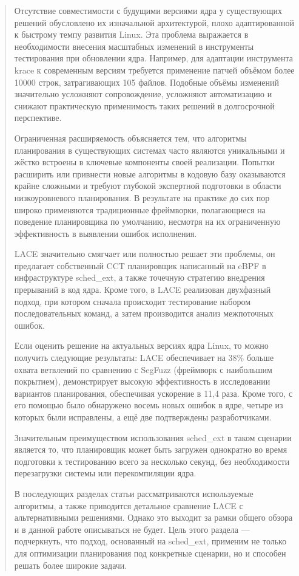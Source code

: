 \documentclass[12pt, oneside]{book}
\begin{document}
\begin{quote}
  Отсутствие совместимости с будущими версиями ядра у существующих решений
  обусловлено их изначальной архитектурой, плохо адаптированной к быстрому
  темпу развития Linux. Эта проблема выражается в необходимости внесения
  масштабных изменений в инструменты тестирования при обновлении ядра.
  Например, для адаптации инструмента krace к современным версиям требуется
  применение патчей объёмом более 10000 строк, затрагивающих 105 файлов.
  Подобные объёмы изменений значительно усложняют сопровождение, усложняют
  автоматизацию и снижают практическую применимость таких решений
  в долгосрочной перспективе.
  
  Ограниченная расширяемость объясняется тем, что алгоритмы
  планирования в существующих системах часто являются уникальными
  и жёстко встроены в ключевые компоненты своей реализации.
  Попытки расширить или привнести новые алгоритмы в кодовую базу
  оказываются крайне сложными и требуют глубокой экспертной подготовки
  в области низкоуровневого планирования. В результате на практике до
  сих пор широко применяются традиционные фреймворки, полагающиеся на
  поведение планировщика по умолчанию, несмотря на их ограниченную
  эффективность в выявлении ошибок исполнения.

  LACE значительно смягчает или полностью решает эти проблемы,
  он предлагает собственный CCT планировщик написанный на eBPF
  в инфраструктуре sched\_ext, а также точечную стратегию внедрения
  прерываний в код ядра. Кроме того, в LACE реализован двухфазный подход,
  при котором сначала происходит тестирование набором последовательных
  команд, а затем производится анализ межпоточных ошибок.
  
  Если оценить решение на актуальных версиях ядра Linux, то можно
  получить следующие результаты: LACE обеспечивает на 
  38\% больше охвата ветвлений по сравнению с SegFuzz 
  (фреймворк с наибольшим покрытием),
  демонстрирует высокую эффективность в исследовании вариантов
  планирования, обеспечивая ускорение в 11,4 раза.
  Кроме того, с его помощью было обнаружено восемь новых ошибок в ядре,
  четыре из которых были исправлены, а ещё две подтверждены разработчиками.

  Значительным преимуществом использования sched\_ext в таком сценарии является
  то, что планировщик может быть загружен однократно во время подготовки
  к тестированию всего за несколько секунд, без необходимости перезагрузки
  системы или перекомпиляции ядра.

  В последующих разделах статьи рассматриваются используемые алгоритмы,
  а также приводится детальное сравнение LACE с альтернативными решениями.
  Однако это выходит за рамки общего обзора и в данной работе описываться не будет.
  Цель этого раздела --- подчеркнуть, что подход, основанный на sched\_ext,
  применим не только для оптимизации планирования под конкретные сценарии,
  но и способен решать более широкие задачи.
\end{quote}
\end{document}
